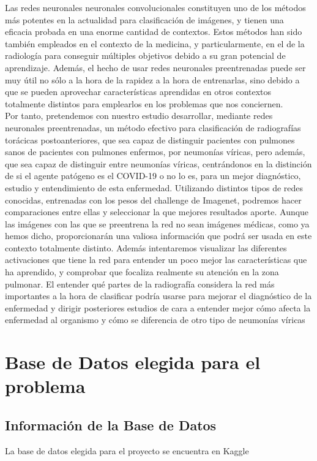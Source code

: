\documentclass[11pt,a4paper]{article}
\theoremstyle{definition}
\begin{document}
Las redes neuronales neuronales convolucionales constituyen uno de los métodos más potentes en la actualidad para clasificación de imágenes,  y tienen una eficacia probada en una enorme cantidad de contextos.  Estos métodos han sido también empleados en el contexto de la medicina, y particularmente, en el de la radiología para conseguir múltiples objetivos debido a su gran potencial de aprendizaje. \cite{problemas1, problemas2} Además, el hecho de usar redes neuronales preentrenadas puede ser muy útil no sólo a la hora de la rapidez a la hora de entrenarlas, sino debido a que se pueden aprovechar características aprendidas en otros contextos totalmente distintos para emplearlos en los problemas que nos conciernen.\\

Por tanto,  pretendemos con nuestro estudio desarrollar, mediante redes neuronales preentrenadas, un método efectivo para clasificación de radiografías torácicas postoanteriores, que sea capaz de distinguir pacientes con pulmones sanos de pacientes con pulmones enfermos, por neumonías víricas, pero además, que sea capaz de distinguir entre neumonías víricas, centrándonos en la distinción de si el agente patógeno es el COVID-19 o no lo es, para un mejor diagnóstico, estudio y entendimiento de esta enfermedad.  Utilizando distintos tipos de redes conocidas, entrenadas con los pesos del challenge de  Imagenet, podremos hacer comparaciones entre ellas y seleccionar la que mejores resultados aporte.  Aunque las imágenes con las que se preentrena la red no sean imágenes médicas, como ya hemos dicho, proporcionarán una valiosa información que podrá ser usada en este contexto totalmente distinto. Además intentaremos visualizar las diferentes activaciones que tiene la red para entender un poco mejor las características que ha aprendido, y comprobar que focaliza realmente su atención en la zona pulmonar.  El entender qué partes de la radiografía considera la red más importantes a la hora de clasificar podría usarse para mejorar el diagnóstico de la enfermedad y dirigir posteriores estudios de cara a entender mejor cómo afecta la enfermedad al organismo y cómo se diferencia de otro tipo de neumonías víricas \\

\section{Base de Datos elegida para el problema}
\subsection{Información de la Base de Datos}
La base de datos elegida para el proyecto se encuentra en Kaggle \cite{kaggle}\\
\end{document}
